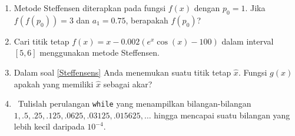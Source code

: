 \begin{enumerate}
$g(x)=(\sqrt{2})^{x}$ dengan $p_{0}=3$.
\item \label{exc:orderOfConvergence-10}Metode Steffensen diterapkan pada
fungsi $f(x)$ dengan $p_{0}=1$. Jika $f(f(p_{0}))=3$ dan $a_{1}=0.75$,
berapakah $f(p_{0})$? \hasananswer 
\item \label{Steffensens}Cari titik tetap $f(x)=x-0.002(e^{x}\cos(x)-100)$
dalam interval $[5,6]$ menggunakan metode Steffensen. \hasananswer 
\item Dalam soal \ref{Steffensens} Anda menemukan suatu titik tetap $\hat{x}$.
Fungsi $g(x)$ apakah yang memiliki $\hat{x}$ sebagai akar?
\item \octave\ Tulislah perulangan \texttt{while} yang menampilkan bilangan-bilangan
$1,.5,.25,.125,.0625,.03125,.015625,\ldots$ hingga mencapai suatu
bilangan yang lebih kecil daripada $10^{-4}$.
\end{enumerate}
\finishexercises
